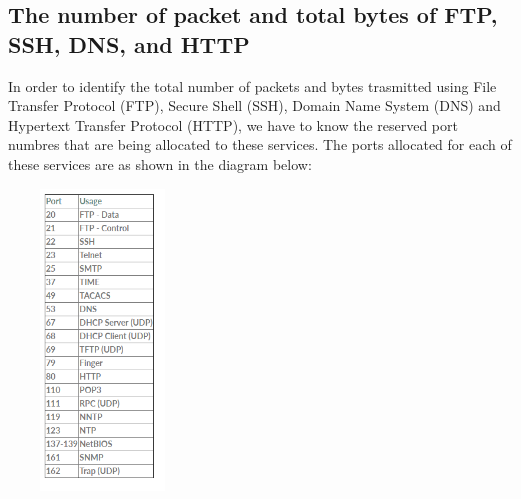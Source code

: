 \documentclass[a4paper,11pt]{article}
\begin{document}
\subsection{The number of packet and total bytes of FTP, SSH, DNS,  and HTTP}
In order to identify the total number of packets and bytes trasmitted using File Transfer Protocol (FTP), Secure Shell (SSH), Domain Name System (DNS) and Hypertext Transfer Protocol (HTTP), we have to know the reserved port numbres that are being allocated to these services. The ports allocated for each of these services are as shown in the diagram below:
\begin{minipage}{6in}
	\centering
		\includegraphics[width = 5cm, height = 8cm]{ports}
		\captionsetup{justification=centering}
\end{minipage}
\linebreak
\end{document}

